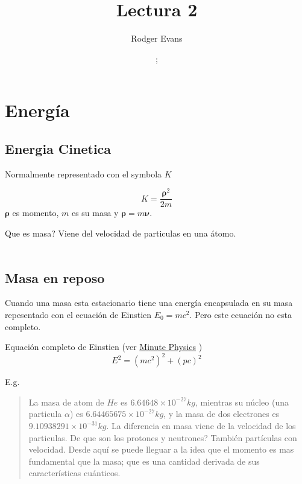 \documentclass[11pt]{article}
\begin{document}
\title{Lectura 2}
\author{Rodger Evans}
\date{ ; }
\maketitle

\section{Energ\'ia}
\subsection{Energia Cinetica}

	Normalmente representado con el symbola $K$

\begin{equation}
	K=\frac{\boldsymbol{\rho}^2}{2m}
\end{equation}
$\boldsymbol{\rho}$ es momento, $m$ es su masa y 
$\boldsymbol{\rho}=m \boldsymbol \nu$.

Que es masa?
Viene del velocidad de particulas en una \'atomo.\\
\\

\subsection{Masa en reposo}

	Cuando una masa esta estacionario tiene una energ\'ia encapsulada en su masa 		repesentado con el ecuaci\'on de Einstien $E_0=mc^2$. Pero este ecuaci\'on no esta completo.

Equaci\'on completo de Einstien (ver \href{http://youtu.be/NnMIhxWRGNw}{Minute Physics} )
\begin{equation}
	E^2=\left ( m c^2 \right )^2 + \left( p c\right)^2
\end{equation}

E.g.

\begin{quote} 
	La masa de atom de $He$ es $6.64648 \times 10^{-27} kg$, mientras su 		n\'ucleo 	(una particula $\alpha$) es $6.64465675 \times 10^{-27}kg$, y la masa de dos electrones es 	$9.10938291 \times 10^{-31}kg $. La diferencia en masa viene de la velocidad de los 	particulas. De que son los protones y neutrones? Tambi\'en part\'iculas con velocidad. 	Desde aqu\'i se puede lleguar a la idea que el momento es mas fundamental que la masa; que 	es una cantidad derivada de sus caracter\'isticas cu\'anticos. 
\end{quote}
\end{document}

